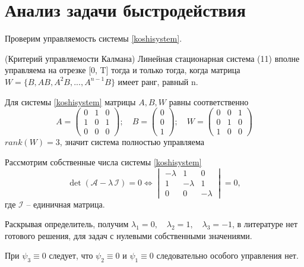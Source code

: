 \documentclass[a4paper,12pt, openany]{book}
\theoremstyle{plain} %
\theoremstyle{definition} %
\theoremstyle{remark} %
\numberwithin{equation}{chapter}
\begin{document}
{\section{Анализ задачи быстродействия}
Проверим управляемость системы \eqref{koshisystem}.

(Критерий управляемости Калмана) Линейная стационарная система (11) вполне управляема на отрезке [0, T] тогда и
только тогда, когда матрица $W = \{B, AB, A^2B, ..., A^{n-1}B\}$ имеет ранг, равный n.

Для системы \eqref{koshisystem} матрицы $A, B, W$ равны соответственно
$$ A =
    \begin{pmatrix}
        0 & 1 & 0 \\
        1 & 0 & 1 \\
        0 & 0 & 0
    \end{pmatrix};
    \quad
    B =
    \begin{pmatrix}
        0 \\
        0 \\
        1
    \end{pmatrix};
    \quad
    W =
    \begin{pmatrix}
        0 & 0 & 1 \\
        0 & 1 & 0 \\
        1 & 0 & 0
        \end{pmatrix}
$$
$rank (W)=3$, значит система полностью управляема

Рассмотрим собственные числа системы \eqref{koshisystem}
\begin{equation}\label{eugen_values}
    \det \left( {{\mathcal{A}} - \lambda\,\mathcal{I}} \right) = 0 \Longleftrightarrow \begin{vmatrix}
        -\lambda & 1        & 0        \\
        1        & -\lambda & 1        \\
        0        & 0        & -\lambda
    \end{vmatrix} = 0,
\end{equation}
где $\mathcal{I}$ -- единичная матрица.

Раскрывая определитель, получим $\lambda_1=0, \quad \lambda_2=1,\quad \lambda_3=-1$,
в литературе \cite{atansfalb} нет готового решения, для задач с нулевыми собственными значениями.

При $\psi_3\equiv0$ следует, что $\psi_2\equiv0$ и $\psi_1\equiv0$ следовательно особого управления нет.

}
\end{document}
